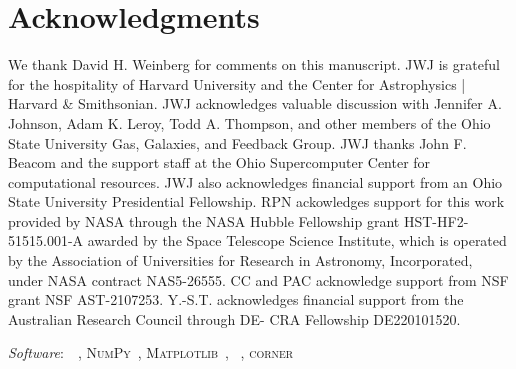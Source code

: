 \documentclass[ms.tex]{subfiles}
\begin{document}
\section{Acknowledgments}
\label{sec:acknowledgments}

We thank David H. Weinberg for comments on this manuscript.
JWJ is grateful for the hospitality of Harvard University and the 
Center for Astrophysics | Harvard \& Smithsonian.
JWJ acknowledges valuable discussion with Jennifer A. Johnson, Adam K. Leroy,
Todd A. Thompson, and other members of the Ohio State University Gas, Galaxies,
and Feedback Group.
JWJ thanks John F. Beacom and the support staff at the Ohio Supercomputer
Center for computational resources.
JWJ also acknowledges financial support from an Ohio State University
Presidential Fellowship.
RPN ackowledges support for this work provided by NASA through the NASA Hubble
Fellowship grant HST-HF2-51515.001-A awarded by the Space Telescope Science
Institute, which is operated by the Association of Universities for Research in
Astronomy, Incorporated, under NASA contract NAS5-26555.
CC and PAC acknowledge support from NSF grant NSF AST-2107253.
Y.-S.T. acknowledges financial support from the Australian Research Council
through DE- CRA Fellowship DE220101520.
\par\null\par\noindent
\textit{Software}:~\vice~\citep{Johnson2020},
\textsc{NumPy}~\citep{Harris2020},
\textsc{Matplotlib}~\citep{Hunter2007},
\mc~\citep{ForemanMackey2013},
\textsc{corner}~\citep{ForemanMackey2016}
\end{document}

